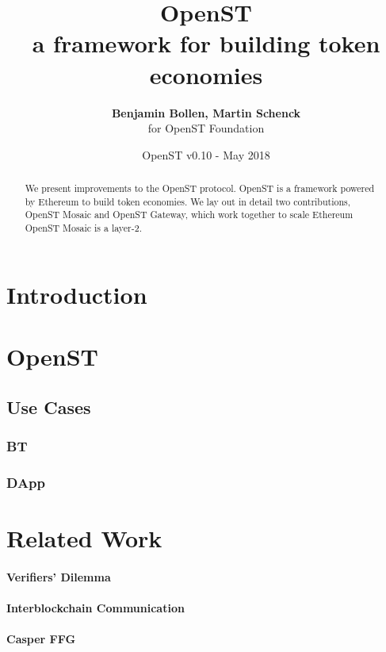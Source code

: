 \documentclass[12pt,a4paper,draft]{article}
\title{OpenST\\\sc\Large{a framework for building token economies}}
\author{\textbf{Benjamin Bollen, Martin Schenck}\\ for OpenST Foundation}
\date{OpenST v0.10 - May 2018}
\begin{document}
\maketitle

\begin{abstract}
We present improvements to the OpenST protocol.
OpenST is a framework powered by Ethereum to build token economies.
We lay out in detail two contributions, OpenST Mosaic and OpenST Gateway,
which work together to scale Ethereum OpenST Mosaic is a layer-2.	
\end{abstract}

\section{Introduction}


\section{OpenST}

\subsection{Use Cases}

\subsubsection{BT}

\subsubsection{DApp}

\section{Related Work}

\paragraph{Verifiers' Dilemma}

\paragraph{Interblockchain Communication}

\paragraph{Casper FFG}
\cite{casperffg}
\end{document}
